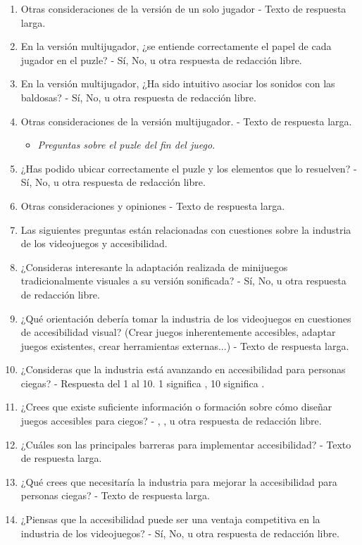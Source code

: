\begin{enumerate}
	\subitem- Sí, No, u otra respuesta de redacción libre.
	\item Otras consideraciones de la versión de un solo jugador
	\subitem- Texto de respuesta larga.
	\item En la versión multijugador, ¿se entiende correctamente el papel de cada jugador en el puzle?
	\subitem- Sí, No, u otra respuesta de redacción libre.
	\item En la versión multijugador, ¿Ha sido intuitivo asociar los sonidos con las baldosas?
	\subitem- Sí, No, u otra respuesta de redacción libre.
	\item Otras consideraciones de la versión multijugador.
	\subitem- Texto de respuesta larga.
	\begin{itemize}
		\item \textit{Preguntas sobre el puzle del fin del juego.}
	\end{itemize}
	\item ¿Has podido ubicar correctamente el puzle y los elementos que lo resuelven?
	\subitem- Sí, No, u otra respuesta de redacción libre.
	\item Otras consideraciones y opiniones
	\subitem- Texto de respuesta larga.
	\item[$\blacksquare$] Las siguientes preguntas están relacionadas con cuestiones sobre la industria de los videojuegos y accesibilidad.
	\item ¿Consideras interesante la adaptación realizada de minijuegos tradicionalmente visuales a su versión sonificada?
	\subitem- Sí, No, u otra respuesta de redacción libre.
	\item ¿Qué orientación debería tomar la industria de los videojuegos en cuestiones de accesibilidad visual? (Crear juegos inherentemente accesibles, adaptar juegos existentes, crear herramientas externas...)
	\subitem- Texto de respuesta larga.
	\item ¿Consideras que la industria está avanzando en accesibilidad para personas ciegas?
	\subitem- Respuesta del 1 al 10. 1 significa , 10 significa .
	\item ¿Crees que existe suficiente información o formación sobre cómo diseñar juegos accesibles para ciegos?
	\subitem- , ,  u otra respuesta de redacción libre.
	\item ¿Cuáles son las principales barreras para implementar accesibilidad?
	\subitem- Texto de respuesta larga.
	\item ¿Qué crees que necesitaría la industria para mejorar la accesibilidad para personas ciegas?
	\subitem- Texto de respuesta larga.
	\item ¿Piensas que la accesibilidad puede ser una ventaja competitiva en la industria de los videojuegos?
	\subitem- Sí, No, u otra respuesta de redacción libre.
\end{enumerate}